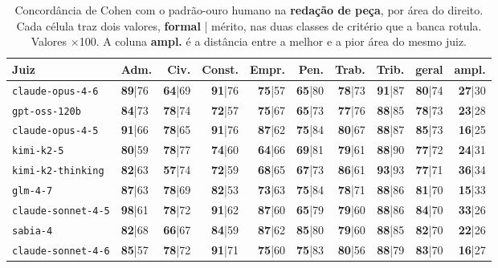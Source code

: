 \documentclass{IOS-Book-Article}
\begin{document}
\begin{table}[!ht]
\centering
\caption{Concordância de Cohen com o padrão-ouro humano na \textbf{redação de peça}, por área do direito. Cada célula traz dois valores, \textbf{formal} | mérito, nas duas classes de critério que a banca rotula. Valores $\times$100. A coluna \textbf{ampl.} é a distância entre a melhor e a pior área do mesmo juiz.}
\footnotesize\setlength{\tabcolsep}{2pt}
\begin{tabular}{llrrrrrrrr}
\hline
\textbf{Juiz} & \textbf{Adm.} & \textbf{Civ.} & \textbf{Const.} & \textbf{Empr.} & \textbf{Pen.} & \textbf{Trab.} & \textbf{Trib.} & \textbf{geral} & \textbf{ampl.} \\
\hline
\texttt{claude-opus-4-6} & \textbf{89}|76 & \textbf{64}|69 & \textbf{91}|76 & \textbf{75}|57 & \textbf{65}|80 & \textbf{78}|73 & \textbf{91}|87 & \textbf{80}|74 & \textbf{27}|30 \\
\texttt{gpt-oss-120b} & \textbf{84}|73 & \textbf{78}|74 & \textbf{72}|57 & \textbf{75}|67 & \textbf{65}|73 & \textbf{77}|76 & \textbf{88}|85 & \textbf{78}|73 & \textbf{23}|28 \\
\texttt{claude-opus-4-5} & \textbf{91}|66 & \textbf{78}|65 & \textbf{91}|76 & \textbf{87}|62 & \textbf{75}|84 & \textbf{80}|67 & \textbf{88}|87 & \textbf{85}|73 & \textbf{16}|25 \\
\texttt{kimi-k2-5} & \textbf{80}|59 & \textbf{78}|77 & \textbf{74}|60 & \textbf{64}|66 & \textbf{69}|81 & \textbf{79}|61 & \textbf{88}|90 & \textbf{77}|72 & \textbf{24}|31 \\
\texttt{kimi-k2-thinking} & \textbf{82}|63 & \textbf{57}|74 & \textbf{72}|59 & \textbf{68}|65 & \textbf{67}|73 & \textbf{86}|61 & \textbf{93}|93 & \textbf{77}|71 & \textbf{36}|34 \\
\texttt{glm-4-7} & \textbf{87}|63 & \textbf{78}|69 & \textbf{82}|53 & \textbf{73}|63 & \textbf{75}|84 & \textbf{78}|71 & \textbf{88}|86 & \textbf{81}|70 & \textbf{15}|33 \\
\texttt{claude-sonnet-4-5} & \textbf{98}|61 & \textbf{78}|72 & \textbf{91}|62 & \textbf{87}|60 & \textbf{65}|79 & \textbf{79}|60 & \textbf{88}|86 & \textbf{84}|70 & \textbf{33}|26 \\
\texttt{sabia-4} & \textbf{82}|68 & \textbf{66}|67 & \textbf{84}|59 & \textbf{87}|62 & \textbf{85}|80 & \textbf{79}|60 & \textbf{88}|85 & \textbf{82}|70 & \textbf{22}|26 \\
\texttt{claude-sonnet-4-6} & \textbf{85}|57 & \textbf{78}|72 & \textbf{91}|71 & \textbf{75}|60 & \textbf{75}|83 & \textbf{80}|56 & \textbf{88}|79 & \textbf{83}|70 & \textbf{16}|27 \\

\end{tabular}
\end{table}
\end{document}
